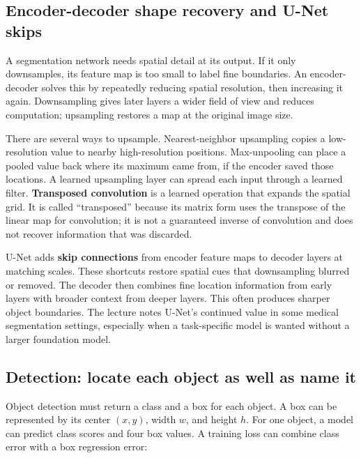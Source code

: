 \subsection{Encoder-decoder shape recovery and U-Net skips}\label{04-visual-computing-ii-ch031-encoder-decoder-shape-recovery-and-u-net-skips}

A segmentation network needs spatial detail at its output. If it only downsamples, its feature map is too small to label fine boundaries. An encoder-decoder solves this by repeatedly reducing spatial resolution, then increasing it again. Downsampling gives later layers a wider field of view and reduces computation; upsampling restores a map at the original image size.

There are several ways to upsample. Nearest-neighbor upsampling copies a low-resolution value to nearby high-resolution positions. Max-unpooling can place a pooled value back where its maximum came from, if the encoder saved those locations. A learned upsampling layer can spread each input through a learned filter. \textbf{Transposed convolution} is a learned operation that expands the spatial grid. It is called ``transposed'' because its matrix form uses the transpose of the linear map for convolution; it is not a guaranteed inverse of convolution and does not recover information that was discarded.

U-Net adds \textbf{skip connections} from encoder feature maps to decoder layers at matching scales. These shortcuts restore spatial cues that downsampling blurred or removed. The decoder then combines fine location information from early layers with broader context from deeper layers. This often produces sharper object boundaries. The lecture notes U-Net's continued value in some medical segmentation settings, especially when a task-specific model is wanted without a larger foundation model.

\subsection{Detection: locate each object as well as name it}\label{04-visual-computing-ii-ch031-detection-locate-each-object-as-well-as-name-it}

Object detection must return a class and a box for each object. A box can be represented by its center \((x,y)\), width \(w\), and height \(h\). For one object, a model can predict class scores and four box values. A training loss can combine class error with a box regression error:

